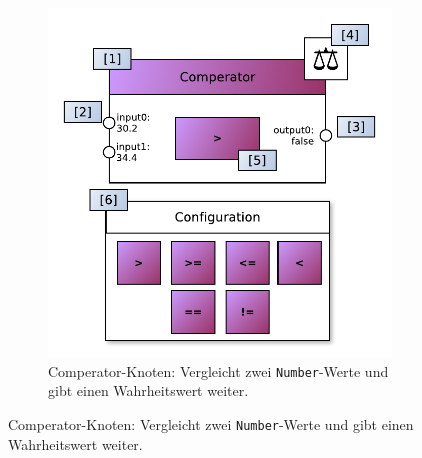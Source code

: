 \begin{figure}[h]
\begin{subfigure}{.5\textwidth}
  \includegraphics[width=1\linewidth]{bilder/Anhang/instancecomperatorfunctionnode.pdf}
  \caption{Comperator-Knoten: Vergleicht zwei \texttt{Number}-Werte und gibt einen Wahrheitswert weiter.}
  \label{fig:actorled}
\end{subfigure}


\end{figure}
